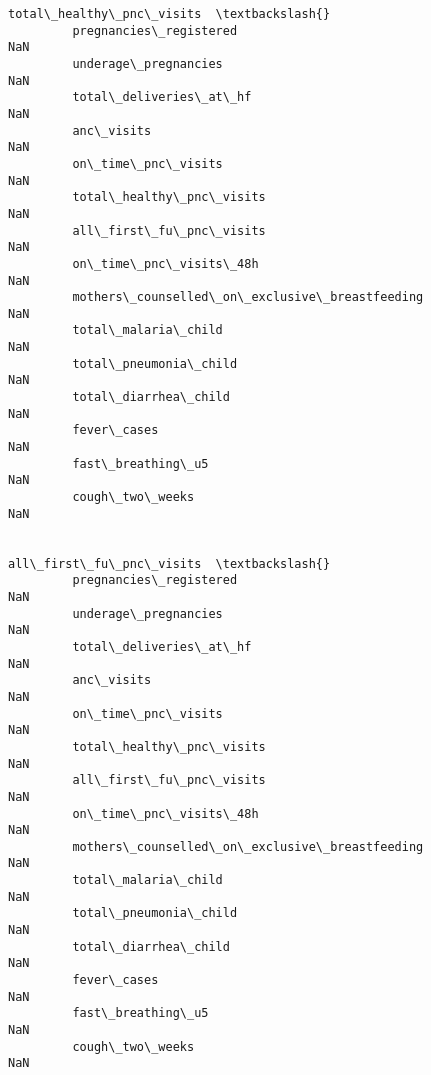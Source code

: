 \documentclass[11pt]{article}
\begin{document}
\begin{Verbatim}[commandchars=\\\{\}]
                                                        total\_healthy\_pnc\_visits  \textbackslash{}
         pregnancies\_registered                                              NaN   
         underage\_pregnancies                                                NaN   
         total\_deliveries\_at\_hf                                              NaN   
         anc\_visits                                                          NaN   
         on\_time\_pnc\_visits                                                  NaN   
         total\_healthy\_pnc\_visits                                            NaN   
         all\_first\_fu\_pnc\_visits                                             NaN   
         on\_time\_pnc\_visits\_48h                                              NaN   
         mothers\_counselled\_on\_exclusive\_breastfeeding                       NaN   
         total\_malaria\_child                                                 NaN   
         total\_pneumonia\_child                                               NaN   
         total\_diarrhea\_child                                                NaN   
         fever\_cases                                                         NaN   
         fast\_breathing\_u5                                                   NaN   
         cough\_two\_weeks                                                     NaN   
         
                                                        all\_first\_fu\_pnc\_visits  \textbackslash{}
         pregnancies\_registered                                             NaN   
         underage\_pregnancies                                               NaN   
         total\_deliveries\_at\_hf                                             NaN   
         anc\_visits                                                         NaN   
         on\_time\_pnc\_visits                                                 NaN   
         total\_healthy\_pnc\_visits                                           NaN   
         all\_first\_fu\_pnc\_visits                                            NaN   
         on\_time\_pnc\_visits\_48h                                             NaN   
         mothers\_counselled\_on\_exclusive\_breastfeeding                      NaN   
         total\_malaria\_child                                                NaN   
         total\_pneumonia\_child                                              NaN   
         total\_diarrhea\_child                                               NaN   
         fever\_cases                                                        NaN   
         fast\_breathing\_u5                                                  NaN   
         cough\_two\_weeks                                                    NaN   
         

\end{Verbatim}
\end{document}
